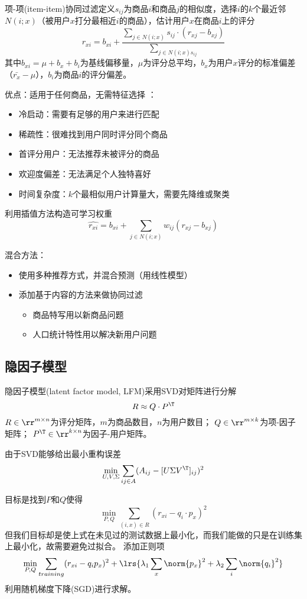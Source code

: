 项-项(item-item)协同过滤定义$s_{ij}$为商品$i$和商品$j$的相似度，选择$i$的$k$个最近邻$N(i;x)$（被用户$x$打分最相近$i$的商品），估计用户$x$在商品$i$上的评分
\[r_{xi}=b_{xi}+\frac{\sum_{j\in N(i;x)}s_{ij}\cdot(r_{xj}-b_{xj})}{\sum_{j\in N(i;x)s_{ij}}}\]
其中$b_{xi}=\mu+b_x+b_i$为基线偏移量，$\mu$为评分总平均，$b_x$为用户$x$评分的标准偏差（$\bar{r_x}-\mu$），$b_i$为商品$i$的评分偏差。

优点：适用于任何商品，无需特征选择
：
\begin{itemize}
	\item 冷启动：需要有足够的用户来进行匹配
	\item 稀疏性：很难找到用户同时评分同个商品
	\item 首评分用户：无法推荐未被评分的商品
	\item 欢迎度偏差：无法满足个人独特喜好
	\item 时间复杂度：$k$个最相似用户计算量大，需要先降维或聚类
\end{itemize}

利用插值方法构造可学习权重
\[\hat{r_{xi}}=b_{xi}+\sum_{j\in N(i;x)}w_{ij}(r_{xj}-b_{xj})\]

混合方法：
\begin{itemize}
\item 使用多种推荐方式，并混合预测（用线性模型）
\item 添加基于内容的方法来做协同过滤
\begin{itemize}
	\item 商品特写用以新商品问题
	\item 人口统计特性用以解决新用户问题
\end{itemize}
\end{itemize}

\subsection{隐因子模型}
隐因子模型(latent factor model, LFM)采用SVD对矩阵进行分解
\[R\approx Q\cdot P^\T\]
$R\in\rr^{m\times n}$为评分矩阵，$m$为商品数目，$n$为用户数目；
$Q\in\rr^{m\times k}$为项-因子矩阵；
$P^\T\in\rr^{k\times n}$为因子-用户矩阵。

由于SVD能够给出最小重构误差
\[\min_{U,V,\Sigma}\sum_{ij\in A}(A_{ij}-[U\Sigma V^\T]_{ij})^2\]

目标是找到$P$和$Q$使得
\[\min_{P,Q}\sum_{(i,x)\in R}(r_{xi}-q_i\cdot p_x)^2\]
但我们目标却是使上式在未见过的测试数据上最小化，而我们能做的只是在训练集上最小化，故需要避免过拟合。
添加正则项
\[\min_{P,Q}\sum_{training}(r_{xi}-q_ip_x)^2+\lrs{\lambda_1\sum_x\norm{p_x}^2+\lambda_2\sum_i\norm{q_i}^2}\]
利用随机梯度下降(SGD)进行求解。

